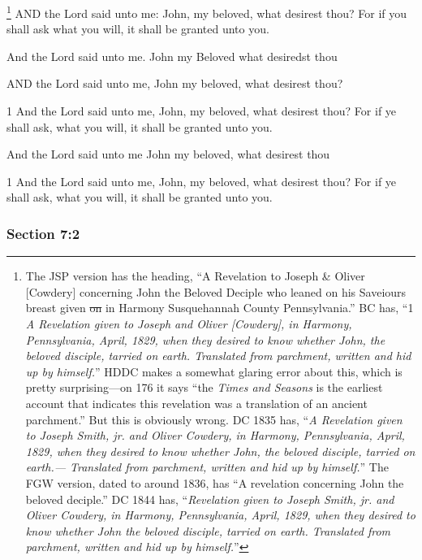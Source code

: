 			\footnote{%
				The JSP version has the heading, ``A Revelation to Joseph \& Oliver [Cowdery] concerning John the Beloved Deciple who leaned on his Saveiours breast given \sout{on} in Harmony Susquehannah County Pennsylvania.'' BC has, ``1 \textit{A Revelation given to Joseph and Oliver [Cowdery], in Harmony, Pennsylvania, April, 1829, when they desired to know whether John, the beloved disciple, tarried on earth. Translated from parchment, written and hid up by himself.}'' HDDC makes a somewhat glaring error about this, which is pretty surprising---on 176 it says ``the \textit{Times and Seasons} is the earliest account that indicates this revelation was a translation of an ancient parchment.'' But this is obviously wrong. DC 1835 has, ``\textit{A Revelation given to Joseph Smith, jr. and Oliver Cowdery, in Harmony, Pennsylvania, April, 1829, when they desired to know whether John, the beloved disciple, tarried on earth.--- Translated from parchment, written and hid up by himself.}'' The FGW version, dated to around 1836, has ``A revelation concerning John the beloved deciple.'' DC 1844 has, ``\textit{Revelation given to Joseph Smith, jr. and Oliver Cowdery, in Harmony, Pennsylvania, April, 1829, when they desired to know whether John the beloved disciple, tarried on earth. Translated from parchment, written and hid up by himself.}''
				}%
		AND the Lord said unto me: John, my beloved, what desirest thou?  For if you shall ask what you will, it shall be granted unto you.

		\begin{framed}
		\scriptsize
			\begin{compactdesc}
				\item[JSP] And the Lord said unto me. John my Beloved what desiredst thou
				\item[BC] AND the Lord said unto me, John my beloved, what desirest thou? 
				\item[DC 1835] 1 And the Lord said unto me, John, my beloved, what desirest thou? For if ye shall ask, what you will, it shall be granted unto you. 
				\item[FGW] And the Lord said unto me John my beloved, what desirest thou 
				\item[DC 1844] 1 And the Lord said unto me, John, my beloved, what desirest thou? For if ye shall ask, what you will, it shall be granted unto you.
			\end{compactdesc}
		\end{framed}

	\subsubsection{Section 7:2} %
		\label{DC7-2}

